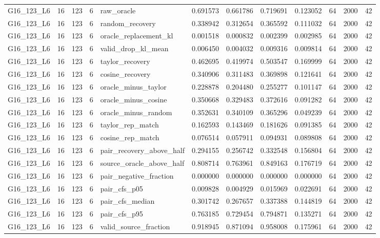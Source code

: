\begin{tabular}{lrlrlrrrrrrr}
G16_123_L6 & 16 & 123 & 6 & raw_oracle & 0.691573 & 0.661786 & 0.719691 & 0.123052 & 64 & 2000 & 42 \\
G16_123_L6 & 16 & 123 & 6 & random_recovery & 0.338942 & 0.312654 & 0.365592 & 0.111032 & 64 & 2000 & 42 \\
G16_123_L6 & 16 & 123 & 6 & oracle_replacement_kl & 0.001518 & 0.000832 & 0.002399 & 0.002985 & 64 & 2000 & 42 \\
G16_123_L6 & 16 & 123 & 6 & valid_drop_kl_mean & 0.006450 & 0.004032 & 0.009316 & 0.009814 & 64 & 2000 & 42 \\
G16_123_L6 & 16 & 123 & 6 & taylor_recovery & 0.462695 & 0.419974 & 0.503547 & 0.169999 & 64 & 2000 & 42 \\
G16_123_L6 & 16 & 123 & 6 & cosine_recovery & 0.340906 & 0.311483 & 0.369898 & 0.121641 & 64 & 2000 & 42 \\
G16_123_L6 & 16 & 123 & 6 & oracle_minus_taylor & 0.228878 & 0.204480 & 0.255277 & 0.101147 & 64 & 2000 & 42 \\
G16_123_L6 & 16 & 123 & 6 & oracle_minus_cosine & 0.350668 & 0.329483 & 0.372616 & 0.091282 & 64 & 2000 & 42 \\
G16_123_L6 & 16 & 123 & 6 & oracle_minus_random & 0.352631 & 0.340109 & 0.365296 & 0.049239 & 64 & 2000 & 42 \\
G16_123_L6 & 16 & 123 & 6 & taylor_rep_match & 0.162593 & 0.143469 & 0.181626 & 0.091385 & 64 & 2000 & 42 \\
G16_123_L6 & 16 & 123 & 6 & cosine_rep_match & 0.076514 & 0.057911 & 0.094931 & 0.089808 & 64 & 2000 & 42 \\
G16_123_L6 & 16 & 123 & 6 & pair_recovery_above_half & 0.294155 & 0.256742 & 0.332548 & 0.156804 & 64 & 2000 & 42 \\
G16_123_L6 & 16 & 123 & 6 & source_oracle_above_half & 0.808714 & 0.763961 & 0.849163 & 0.176719 & 64 & 2000 & 42 \\
G16_123_L6 & 16 & 123 & 6 & pair_negative_fraction & 0.000000 & 0.000000 & 0.000000 & 0.000000 & 64 & 2000 & 42 \\
G16_123_L6 & 16 & 123 & 6 & pair_cfs_p05 & 0.009828 & 0.004929 & 0.015969 & 0.022691 & 64 & 2000 & 42 \\
G16_123_L6 & 16 & 123 & 6 & pair_cfs_median & 0.301742 & 0.267657 & 0.337388 & 0.144819 & 64 & 2000 & 42 \\
G16_123_L6 & 16 & 123 & 6 & pair_cfs_p95 & 0.763185 & 0.729454 & 0.794871 & 0.135271 & 64 & 2000 & 42 \\
G16_123_L6 & 16 & 123 & 6 & valid_source_fraction & 0.918945 & 0.871094 & 0.958008 & 0.175961 & 64 & 2000 & 42 \\

\end{tabular}

